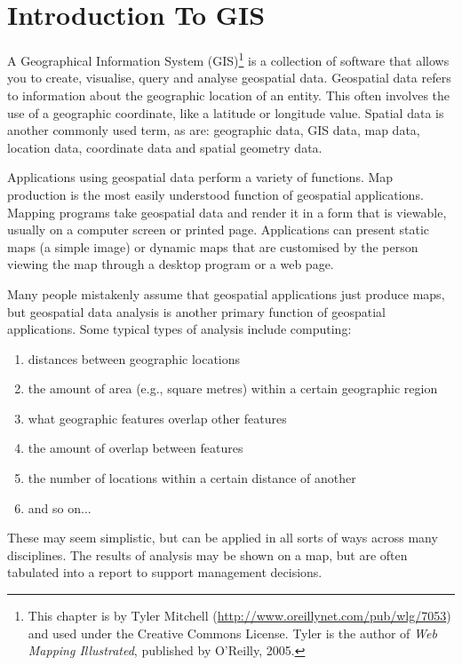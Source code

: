 
\section{Introduction To GIS}\label{label_intro}

A Geographical Information System (GIS)\footnote{This chapter is by Tyler
Mitchell (\url{http://www.oreillynet.com/pub/wlg/7053}) and
used under the Creative Commons License. Tyler is the author of 
\textit{Web Mapping Illustrated}, published by O'Reilly, 2005.}
is a collection of software that allows you to create, visualise, query and
analyse geospatial data. Geospatial data refers to information about the
geographic location of an entity. This often involves the use of a
geographic coordinate, like a latitude or longitude value. Spatial data is
another commonly used term, as are: geographic data, GIS data, map data,
location data, coordinate data and spatial geometry data.

Applications using geospatial data perform a variety of functions. Map
production is the most easily understood function of geospatial
applications. Mapping programs take geospatial data and render it in a form
that is viewable, usually on a computer screen or printed page.
Applications can present static maps (a simple image) or dynamic maps that
are customised by the person viewing the map through a desktop program or a
web page.

Many people mistakenly assume that geospatial applications just produce
maps, but geospatial data analysis is another primary function of
geospatial applications. Some typical types of analysis include computing:

\begin{enumerate}
\item distances between geographic locations
\item the amount of area (e.g., square metres) within a certain geographic
region
\item what geographic features overlap other features
\item the amount of overlap between features
\item the number of locations within a certain distance of another
\item and so on...
\end{enumerate}

These may seem simplistic, but can be applied in all sorts of ways across
many disciplines. The results of analysis may be shown on a map, but are
often tabulated into a report to support management decisions.

